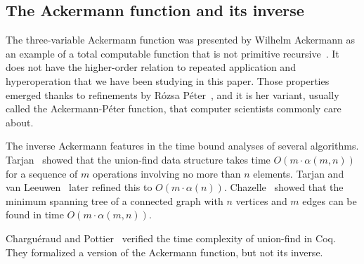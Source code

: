 \subsection{The Ackermann function and its inverse}
The three-variable Ackermann function was presented by
Wilhelm Ackermann as an example of a total computable function that
is not primitive recursive~\cite{ackermann}.
It does not have the higher-order
relation to repeated application and hyperoperation that we have been studying in
this paper. Those properties emerged thanks to refinements by Rózsa Péter~\cite{peter},
and it is her variant, usually called the Ackermann-Péter function,
that computer scientists commonly care about.

The inverse Ackermann
features in the time bound analyses of several algorithms.
Tarjan~\cite{tarjan} showed that the union-find data structure
takes time $O(m\cdot\alpha(m,n))$ for a sequence of $m$ operations
involving no more than $n$ elements.
Tarjan and van Leeuwen~\cite{tarjan2} later refined this to $O(m\cdot\alpha(n))$.
Chazelle~\cite{chazelle} showed that the minimum spanning tree
of a connected graph with $n$ vertices and $m$ edges
can be found in time $O(m\cdot\alpha(m,n))$.

Chargu\'eraud and Pottier~\cite{charpott}
verified the time complexity of union-find in Coq.
They formalized a version of the Ackermann function, but not its inverse.


